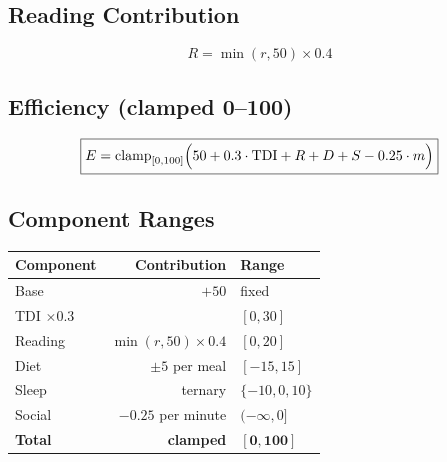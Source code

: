\documentclass{article}
\begin{document}
\subsection*{Reading Contribution}
\[
R = \min(r, 50) \times 0.4
\]

\subsection*{Efficiency (clamped 0–100)}
\[
\boxed{E = \operatorname{clamp}_{[0,100]}\Bigl(50 + 0.3 \cdot \text{TDI} + R + D + S - 0.25 \cdot m\Bigr)}
\]

\subsection*{Component Ranges}
\begin{center}
\begin{tabular}{lrl}
\textbf{Component} & \textbf{Contribution} & \textbf{Range} \\ \hline
Base & $+50$ & fixed \\
TDI $\times 0.3$ & & $[0, 30]$ \\
Reading & $\min(r,50) \times 0.4$ & $[0, 20]$ \\
Diet & $\pm 5$ per meal & $[-15, 15]$ \\
Sleep & ternary & $\{-10, 0, 10\}$ \\
Social & $-0.25$ per minute & $(-\infty, 0]$ \\ \hline
\textbf{Total} & \textbf{clamped} & $\mathbf{[0, 100]}$
\end{tabular}
\end{center}
\end{document}
